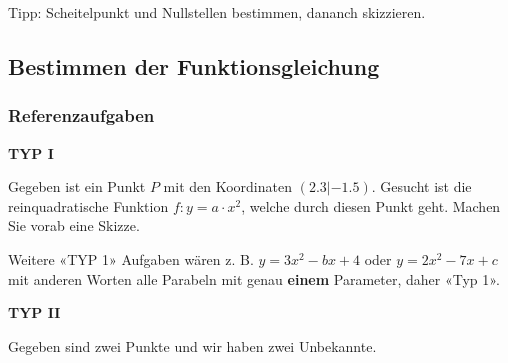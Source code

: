 Tipp: Scheitelpunkt und Nullstellen bestimmen, dananch skizzieren.

\newpage

\subsection{Bestimmen der Funktionsgleichung}

\subsubsection{Referenzaufgaben}

\textbf{TYP I}

Gegeben ist ein Punkt $P$ mit den Koordinaten $(2.3 | -1.5)$. Gesucht ist die reinquadratische Funktion $f: y=a\cdot{}x^2$, welche durch diesen Punkt geht.
Machen Sie vorab eine Skizze.




Weitere «TYP 1» Aufgaben wären z. B. $y = 3x^2 - bx + 4$ oder $y=2x^2
-7x + c$ mit anderen Worten alle Parabeln mit genau \textbf{einem}
Parameter, daher «Typ 1».

\newpage



\textbf{TYP II}

Gegeben sind zwei Punkte und wir haben zwei Unbekannte.

